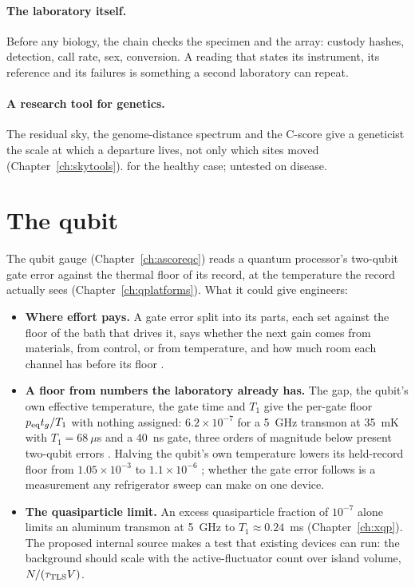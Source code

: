 \paragraph{The laboratory itself.} Before any biology, the chain checks the specimen and the array: custody hashes, detection, call rate, sex,
conversion. A reading that states its instrument, its reference and its failures is
something a second laboratory can repeat.

\paragraph{A research tool for genetics.} The residual sky, the genome-distance spectrum and the C-score give a geneticist the scale at
which a departure lives, not only which sites moved (Chapter~\ref{ch:skytools}). \measured{} for the healthy case; untested on disease.

\section{The qubit}

The qubit gauge (Chapter~\ref{ch:ascoreqc}) reads a quantum processor's two-qubit gate error against the thermal floor of its record, at the
temperature the record actually sees (Chapter~\ref{ch:qplatforms}). What it could give engineers:
\begin{itemize}
\item \textbf{Where effort pays.} A gate error split into its parts, each set against the floor of the bath that drives it, says whether the
next gain comes from materials, from control, or from temperature, and how much room each channel has before its floor \interp.
\item \textbf{A floor from numbers the laboratory already has.} The gap, the qubit's own effective temperature, the gate time and $T_1$ give the
per-gate floor $p_{\rm eq}t_g/T_1$ with nothing assigned: $6.2\times10^{-7}$ for a 5~GHz transmon at 35~mK with $T_1=68~\mu$s and a 40~ns gate,
three orders of magnitude below present two-qubit errors \calc. Halving the qubit's own temperature lowers its held-record floor from
$1.05\times10^{-3}$ to $1.1\times10^{-6}$ \calc; whether the gate error follows is a measurement any refrigerator sweep can make on one device.
\openprob
\item \textbf{The quasiparticle limit.} An excess quasiparticle fraction of $10^{-7}$ alone limits an aluminum transmon at 5~GHz to
$T_1\approx0.24$~ms (Chapter~\ref{ch:xqp}). \calc{} The proposed internal source makes a test that existing devices can run: the background should
scale with the active-fluctuator count over island volume, $N/(\tau_{\rm TLS}V)$. \prediction
\end{itemize}

